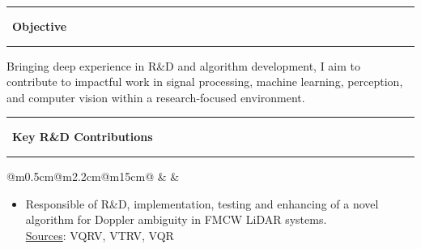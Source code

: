 \documentclass[10pt,a4paper]{article}
\newcommand{\sectionline}[1]{%
  \vspace{0.5em}
  \begin{center}
    \textcolor{title_color}{\rule[0.5ex]{0.25\linewidth}{0.5pt}}
    ~{\LARGE \bfseries \textcolor{title_color}{\cambria #1}}~
    \textcolor{title_color}{\rule[0.5ex]{0.25\linewidth}{0.5pt}}
  \end{center}
  \vspace{0.05em}
}
\begin{document}
\sectionline{Objective}
\textcolor{blocktext1_color}{Bringing deep experience in R\&D and algorithm development, I aim to contribute to impactful work in signal processing, machine learning, perception, and computer vision within a research-focused environment.}

\sectionline{Key R\&D Contributions}

                         
\begin{tabular}{@{}m{0.5cm}@{\hspace{0.5em}}m{2.2cm}@{\hspace{0.5em}}m{15cm}@{}}
   & 
  \raisebox{1.8em}{\begin{minipage}[t]{\linewidth}
  \centering
    \textcolor{blocktitle1_color}{Sep. 21}\\
    \textcolor{blocktitle1_color}{Present}
  \end{minipage} 
  } &
\end{tabular}

                         
\vspace{-1em}
\begin{itemize}[leftmargin=*]
  \item Responsible of R\&D, implementation, testing and enhancing of a novel algorithm for Doppler ambiguity in FMCW LiDAR systems.
  \\ {\fontsize{10pt}{10pt}\selectfont\textcolor{blocktext2_color}{{\fontsize{10pt}{10pt}\selectfont\textcolor{blocktext2_color}{\href{https://amr-aboughazala.super.site/doppler-ambiguity-solution}{Sources}}}: VQRV, VTRV, VQR}}
  

\end{itemize}
\end{document}
